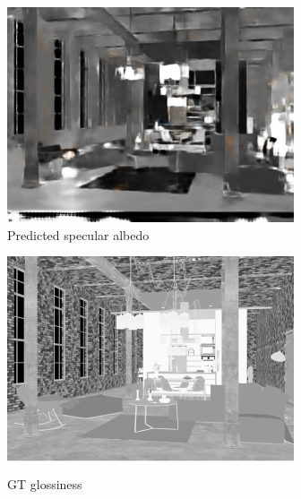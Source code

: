 \begin{figure}
\begin{subfigure}{0.32\linewidth}
    \includegraphics[width=\linewidth]{praca/images/AI46_009_Cam01.VRayLightSelect_RE_L0.specular_output.png}
    \caption{Predicted specular albedo}
  \end{subfigure}
  \begin{subfigure}{0.32\linewidth}
    \includegraphics[width=\linewidth]{praca/images/AI46_009_Cam01.VRayLightSelect_RE_L0.glossiness.png}
    \caption{GT glossiness}
  \end{subfigure}
  \begin{subfigure}{0.32\linewidth}

\end{subfigure}
\end{figure}
